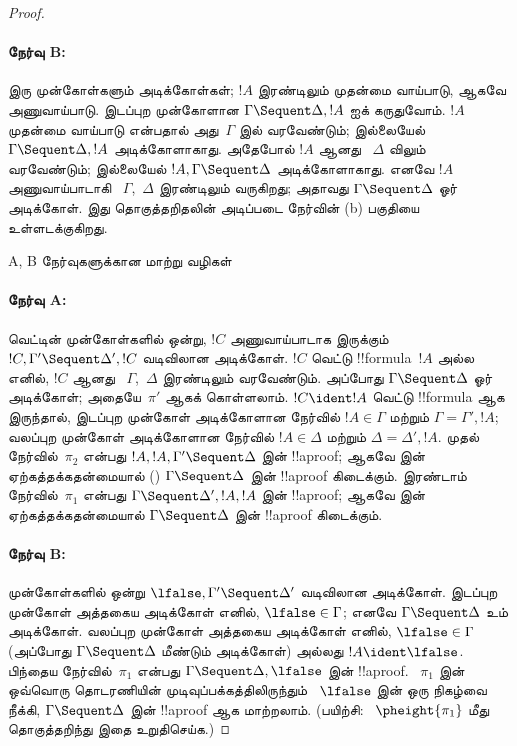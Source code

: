 \documentclass[../../../include/open-logic-section]{subfiles}
\begin{document}
\begin{proof}
\paragraph{நேர்வு B:}
இரு முன்கோள்களும்
அடிக்கோள்கள்; $!A$
இரண்டிலும் முதன்மை
வாய்பாடு, ஆகவே அணுவாய்பாடு.
இடப்புற முன்கோளான
$\Gamma \Sequent \Delta, !A$
ஐக் கருதுவோம்.
$!A$ முதன்மை வாய்பாடு
என்பதால் அது~$\Gamma$ இல்
வரவேண்டும்; இல்லையேல்
$\Gamma \Sequent \Delta, !A$
அடிக்கோளாகாது.
அதேபோல் $!A$ ஆனது
~$\Delta$ விலும் வரவேண்டும்;
இல்லையேல்
$!A, \Gamma \Sequent \Delta$
அடிக்கோளாகாது.
எனவே $!A$ அணுவாய்பாடாகி
~$\Gamma$,~$\Delta$
இரண்டிலும் வருகிறது;
அதாவது
$\Gamma \Sequent \Delta$
ஓர் அடிக்கோள்.
இது தொகுத்தறிதலின்
அடிப்படை நேர்வின் (b)
பகுதியை உள்ளடக்குகிறது.

\begin{center}
A, B நேர்வுகளுக்கான மாற்று வழிகள்
\end{center}

\paragraph{நேர்வு A:}
வெட்டின் முன்கோள்களில் ஒன்று,
$!C$ அணுவாய்பாடாக இருக்கும்
$!C, \Gamma' \Sequent \Delta', !C$
வடிவிலான அடிக்கோள்.
$!C$ வெட்டு !!{formula}~$!A$
அல்ல எனில், $!C$ ஆனது
~$\Gamma$,~$\Delta$
இரண்டிலும் வரவேண்டும்.
அப்போது
$\Gamma \Sequent \Delta$
ஓர் அடிக்கோள்; அதையே~$\pi'$
ஆகக் கொள்ளலாம்.
$!C \ident !A$ வெட்டு
!!{formula} ஆக இருந்தால்,
இடப்புற முன்கோள்
அடிக்கோளான நேர்வில்
$!A \in \Gamma$ மற்றும்
$\Gamma = \Gamma', !A$;
வலப்புற முன்கோள்
அடிக்கோளான நேர்வில்
$!A \in \Delta$ மற்றும்
$\Delta = \Delta', !A$.
முதல் நேர்வில்~$\pi_2$
என்பது
$!A, !A, \Gamma' \Sequent \Delta$
இன் !!a{proof}; ஆகவே
\LeftR{\Contraction} இன்
ஏற்கத்தக்கதன்மையால்
()
$\Gamma \Sequent \Delta$
இன் !!a{proof} கிடைக்கும்.
இரண்டாம் நேர்வில்~$\pi_1$
என்பது
$\Gamma \Sequent \Delta', !A, !A$
இன் !!a{proof}; ஆகவே
\RightR{\Contraction} இன்
ஏற்கத்தக்கதன்மையால்
$\Gamma \Sequent \Delta$
இன் !!a{proof} கிடைக்கும்.

\paragraph{நேர்வு B:}
முன்கோள்களில் ஒன்று
$\lfalse, \Gamma' \Sequent \Delta'$
வடிவிலான அடிக்கோள்.
இடப்புற முன்கோள்
அத்தகைய அடிக்கோள் எனில்,
$\lfalse \in \Gamma$;
எனவே $\Gamma \Sequent \Delta$
உம் அடிக்கோள்.
வலப்புற முன்கோள்
அத்தகைய அடிக்கோள் எனில்,
$\lfalse \in \Gamma$
(அப்போது
$\Gamma \Sequent \Delta$
மீண்டும் அடிக்கோள்)
அல்லது $!A \ident \lfalse$.
பிந்தைய நேர்வில்~$\pi_1$
என்பது
$\Gamma \Sequent \Delta, \lfalse$
இன் !!a{proof}.
~$\pi_1$ இன் ஒவ்வொரு
தொடரணியின் முடிவுப்பக்கத்திலிருந்தும்
~$\lfalse$ இன் ஒரு
நிகழ்வை நீக்கி,
$\Gamma \Sequent \Delta$
இன் !!a{proof} ஆக
மாற்றலாம்.
(பயிற்சி: ~$\pheight{\pi_1}$
மீது தொகுத்தறிந்து
இதை உறுதிசெய்க.)


\end{proof}
\end{document}
